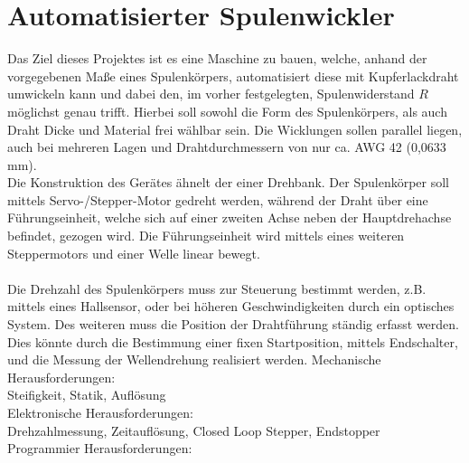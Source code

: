 \section{Automatisierter Spulenwickler}

Das Ziel dieses Projektes ist es eine Maschine zu bauen,  welche, anhand der vorgegebenen Maße eines Spulenkörpers, automatisiert diese mit Kupferlackdraht umwickeln kann und dabei den, im vorher festgelegten, Spulenwiderstand $R$ möglichst genau trifft. Hierbei soll sowohl die Form des Spulenkörpers, als auch Draht Dicke und Material frei wählbar sein. Die Wicklungen sollen parallel liegen, auch bei mehreren Lagen und Drahtdurchmessern von nur ca. AWG 42 (0,0633 mm).\\
Die Konstruktion des Gerätes ähnelt der einer Drehbank. Der Spulenkörper soll mittels Servo-/Stepper-Motor gedreht werden, während der Draht über eine Führungseinheit, welche sich auf einer zweiten Achse neben der Hauptdrehachse befindet, gezogen wird. Die Führungseinheit wird mittels eines weiteren Steppermotors und einer Welle linear bewegt.\\
\\
Die Drehzahl des Spulenkörpers muss zur Steuerung bestimmt werden, z.B. mittels eines Hallsensor, oder bei höheren Geschwindigkeiten durch ein optisches System. Des weiteren muss die Position der Drahtführung ständig erfasst werden. Dies könnte durch die Bestimmung einer fixen Startposition, mittels Endschalter, und die Messung der Wellendrehung realisiert werden.
Mechanische Herausforderungen:\\
Steifigkeit, Statik, Auflösung\\
Elektronische Herausforderungen:\\
Drehzahlmessung, Zeitauflösung, Closed Loop Stepper, Endstopper\\
Programmier Herausforderungen:\\
